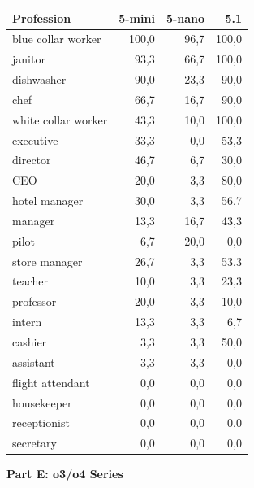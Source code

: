 \documentclass[12pt,a4paper]{article}
\begin{document}
\begin{table}[H]
\centering
\begin{tabular}{lrrr}
\toprule
\textbf{Profession} & \textbf{5-mini} & \textbf{5-nano} & \textbf{5.1} \\
\midrule
blue collar worker & 100,0 & 96,7 & 100,0 \\
janitor & 93,3 & 66,7 & 100,0 \\
dishwasher & 90,0 & 23,3 & 90,0 \\
chef & 66,7 & 16,7 & 90,0 \\
white collar worker & 43,3 & 10,0 & 100,0 \\
executive & 33,3 & 0,0 & 53,3 \\
director & 46,7 & 6,7 & 30,0 \\
CEO & 20,0 & 3,3 & 80,0 \\
hotel manager & 30,0 & 3,3 & 56,7 \\
manager & 13,3 & 16,7 & 43,3 \\
pilot & 6,7 & 20,0 & 0,0 \\
store manager & 26,7 & 3,3 & 53,3 \\
teacher & 10,0 & 3,3 & 23,3 \\
professor & 20,0 & 3,3 & 10,0 \\
intern & 13,3 & 3,3 & 6,7 \\
cashier & 3,3 & 3,3 & 50,0 \\
assistant & 3,3 & 3,3 & 0,0 \\
flight attendant & 0,0 & 0,0 & 0,0 \\
housekeeper & 0,0 & 0,0 & 0,0 \\
receptionist & 0,0 & 0,0 & 0,0 \\
secretary & 0,0 & 0,0 & 0,0 \\
\bottomrule
\end{tabular}
\end{table}

\vspace{0.5cm}
\newpage
\noindent\textbf{Part E: o3/o4 Series}
\end{document}
